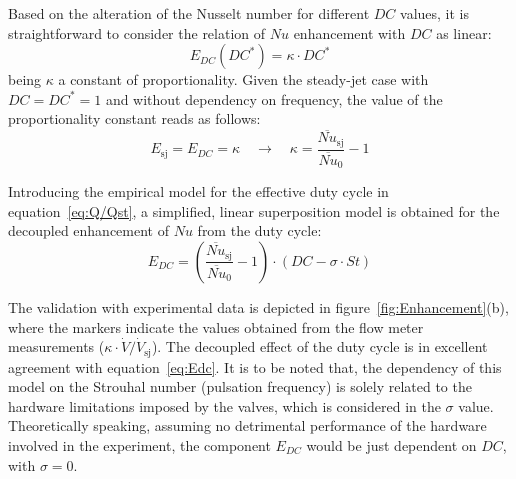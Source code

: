 Based on the alteration of the Nusselt number for different $DC$ values, it is straightforward to consider the relation of $Nu$ enhancement with $DC$ as linear:
%
\begin{equation}\label{eq:Edc1}
    E_{DC}(DC^*) = \kappa \cdot DC^*
\end{equation}
%
being $\kappa$ a constant of proportionality. Given the steady-jet case with $DC = DC^* = 1$ and without dependency on frequency, the value of the proportionality constant reads as follows:
\begin{equation}\label{eq:Edc2}
    E_{\mathrm{sj}} = E_{DC} = \kappa \quad \rightarrow \quad \kappa = \frac{\overline{Nu}_{\mathrm{sj}}}{\overline{Nu}_0}-1
\end{equation}

Introducing the empirical model for the effective duty cycle in equation~\ref{eq:Q/Qst}, a simplified, linear superposition model is obtained for the decoupled enhancement of $Nu$ from the duty cycle: 
\begin{equation}\label{eq:Edc}
E_{DC} = \left(\frac{\overline{Nu}_{\mathrm{sj}}}{\overline{Nu}_0}-1\right) \cdot \left(DC - \sigma \cdot St\right)
\end{equation}

The validation with experimental data is depicted in figure~\ref{fig:Enhancement}(b), where the markers indicate the values obtained from the flow meter measurements ($\kappa\cdot \dot{V}/\dot{V}_{\mathrm{sj}}$). The decoupled effect of the duty cycle is in excellent agreement with equation~\ref{eq:Edc}. It is to be noted that, the dependency of this model on the Strouhal number (pulsation frequency) is solely related to the hardware limitations imposed by the valves, which is considered in the $\sigma$ value. Theoretically speaking, assuming no detrimental performance of the hardware involved in the experiment, the component $E_{DC}$ would be just dependent on $DC$, with $\sigma = 0$.

